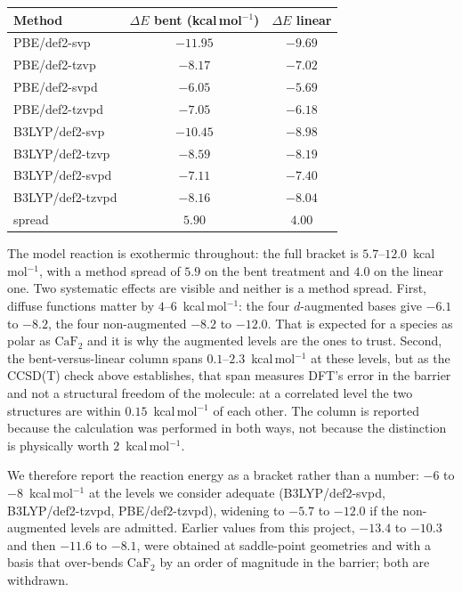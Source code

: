 \begin{center}
\begin{tabular}{lcc}
\hline
Method & $\Delta E$ bent (kcal\,mol$^{-1}$) & $\Delta E$ linear \\
\hline
PBE/def2-svp     & $-11.95$ & $-9.69$ \\
PBE/def2-tzvp    & $-8.17$  & $-7.02$ \\
PBE/def2-svpd    & $-6.05$  & $-5.69$ \\
PBE/def2-tzvpd   & $-7.05$  & $-6.18$ \\
B3LYP/def2-svp   & $-10.45$ & $-8.98$ \\
B3LYP/def2-tzvp  & $-8.59$  & $-8.19$ \\
B3LYP/def2-svpd  & $-7.11$  & $-7.40$ \\
B3LYP/def2-tzvpd & $-8.16$  & $-8.04$ \\
\hline
spread & $5.90$ & $4.00$ \\
\hline
\end{tabular}
\end{center}

The model reaction is exothermic throughout: the full bracket is
$5.7$--$12.0$~kcal\,mol$^{-1}$, with a method spread of $5.9$ on the bent treatment
and $4.0$ on the linear one. Two systematic effects are visible and neither is a
method spread. First, diffuse functions matter by $4$--$6$~kcal\,mol$^{-1}$: the
four $d$-augmented bases give $-6.1$ to $-8.2$, the four non-augmented $-8.2$ to
$-12.0$. That is expected for a species as polar as $\mathrm{CaF_2}$ and it is why
the augmented levels are the ones to trust. Second, the bent-versus-linear column spans
$0.1$--$2.3$~kcal\,mol$^{-1}$ at these levels, but as the CCSD(T) check above
establishes, that span measures DFT's error in the barrier and not a structural
freedom of the molecule: at a correlated level the two structures are within
$0.15$~kcal\,mol$^{-1}$ of each other. The column is reported because the
calculation was performed in both ways, not because the distinction is physically
worth $2$~kcal\,mol$^{-1}$.

We therefore report the reaction energy as a bracket rather than a number:
$-6$ to $-8$~kcal\,mol$^{-1}$ at the levels we consider adequate
(B3LYP/def2-svpd, B3LYP/def2-tzvpd, PBE/def2-tzvpd), widening to $-5.7$ to
$-12.0$ if the non-augmented levels are admitted. Earlier values from this project,
$-13.4$ to $-10.3$ and then $-11.6$ to $-8.1$, were obtained at saddle-point
geometries and with a basis that over-bends $\mathrm{CaF_2}$ by an order of
magnitude in the barrier; both are withdrawn.

